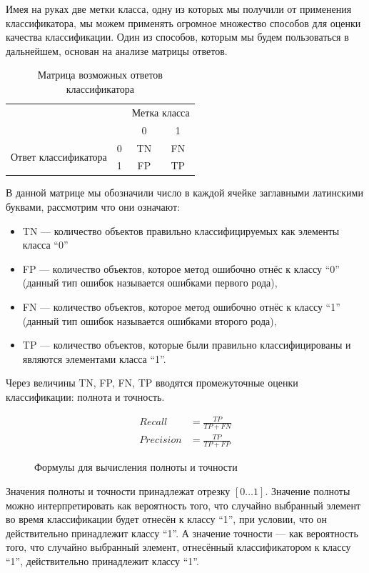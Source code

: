 Имея на руках две метки класса, одну из которых мы получили от применения классификатора, мы можем применять огромное множество способов для оценки качества классификации. Один из способов, которым мы будем пользоваться в дальнейшем, основан на анализе матрицы ответов.

\begin{table}[ht]
\caption{Матрица возможных ответов классификатора}
\label{tab_weight}
\centering
    \begin{tabular}{|c|c|c|c|}
    \hline \multicolumn{2}{|c|}{} & \multicolumn{2}{c|}{Метка класса} \\
    \cline {2-4} & & 0 & 1 \\
   	\hline \multirow{2}{*}{Ответ классификатора} &  0 & TN & FN \\
   	\cline {2-4} & 1 & FP & TP \\
    \hline
    \end{tabular}
\end{table}


В данной матрице мы обозначили число в каждой ячейке заглавными латинскими буквами, рассмотрим что они означают:
\begin{itemize}
\item  TN — количество объектов правильно классифицируемых как элементы класса “0”
\item  FP — количество объектов, которое метод ошибочно отнёс к классу “0” (данный тип ошибок называется ошибками первого рода),
\item  FN — количество объектов, которое метод ошибочно отнёс к классу “1” (данный тип ошибок называется ошибками второго рода),
\item  TP — количество объектов, которые были правильно классифицированы и являются элементами класса “1”.
\end{itemize}
Через величины TN, FP, FN, TP вводятся промежуточные оценки классификации: полнота и точность.

\begin{figure}[ht]
\begin{align}
Recall &= \frac{TP}{TP + FN} \\[0.5cm]
Precision &= \frac{TP}{TP + FP}
\end{align}
\caption{Формулы для вычисления полноты и точности}
\end{figure}

Значения полноты и точности принадлежат отрезку $[0 \dots 1]$. Значение полноты можно интерпретировать как вероятность того, что случайно выбранный элемент во время классификации будет отнесён к классу “1”, при условии, что он действительно принадлежит классу “1”. А значение точности — как вероятность того, что случайно выбранный элемент, отнесённый классификатором к классу “1”, действительно принадлежит классу “1”.

